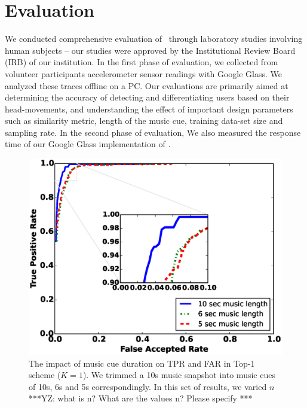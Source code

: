 \section{Evaluation}\label{sec:results}

We conducted comprehensive evaluation of \systemname~through laboratory studies involving
human subjects -- our studies were approved by the Institutional Review Board (IRB) of our
institution. In the first phase of evaluation, we collected from volunteer participants accelerometer sensor
readings with Google Glass. We analyzed these traces offline on a PC.
Our evaluations are primarily aimed at determining the accuracy of detecting
and differentiating users based on their head-movements, and understanding
the effect of important design parameters such as similarity metric, length of the music cue, training
data-set size and sampling rate. In the second phase of evaluation, We also measured the response time of our Google
Glass implementation of \systemname.



\begin{figure}[t]
\centering
\includegraphics [width=\columnwidth]{figure/top1_roc.eps}
\caption{The impact of music cue duration on TPR and FAR in Top-1 scheme ($K = 1$). We trimmed a 10s music snapshot into music cues of 10s, 6s and 5s correspondingly. In this set of results, we varied $n$ ***YZ: what is n? What are the values n? Please specify ***}
\label{fig:roc-top1}
\end{figure}

